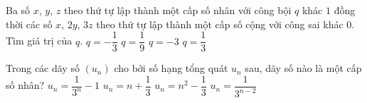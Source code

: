 \begin{ex}%
	Ba số $x$, $y$, $z$ theo thứ tự lập thành một cấp số nhân với công bội $q$ khác $1$ đồng thời các số $x$, $2y$, $3z$ theo thứ tự lập thành một cấp số cộng với công sai khác $0$. Tìm giá trị của $q$.
	\choice
	{$q=-\dfrac{1}{3}$}
	{$q=\dfrac{1}{9}$}
	{$q=-3$}
	{\True $q=\dfrac{1}{3}$}
\end{ex}
\begin{ex}%
	Trong các dãy số $(u_n)$ cho bởi số hạng tổng quát $u_n$ sau, dãy số nào là một cấp số nhân?
	\choice
	{$u_n=\dfrac{1}{3^n}-1$}
	{$u_n=n+\dfrac{1}{3}$}
	{$u_n=n^2-\dfrac{1}{3}$}
	{\True $u_n=\dfrac{1}{3^{n-2}}$}
\end{ex}
